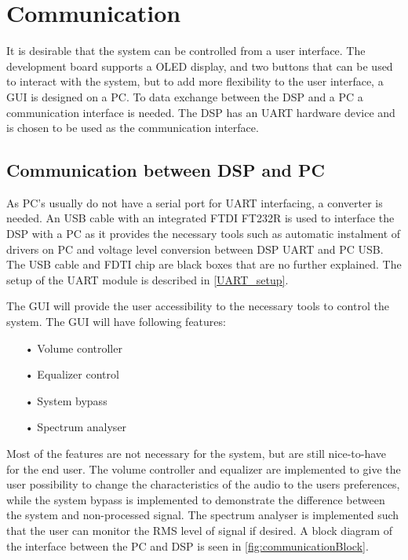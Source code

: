 \chapter{Communication}

It is desirable that the system can be controlled from a user interface. The development board supports a OLED display, and two buttons that can be used to interact with the system, but to add more flexibility to the user interface, a GUI is designed on a PC. To data exchange between the DSP and a PC a communication interface is needed. The DSP has an UART hardware device and is chosen to be used as the communication interface. 

\section{Communication between DSP and PC}

As PC's usually do not have a serial port for UART interfacing, a converter is needed.   An USB cable with an integrated FTDI FT232R is used to interface the DSP with a PC as it provides the necessary tools such as automatic instalment of drivers on PC and voltage level conversion between DSP UART and PC USB. The USB cable and FDTI chip are black boxes that are no further explained. The setup of the UART module is described in \autoref{UART_setup}.

The GUI will provide the user accessibility to the necessary tools to control the system. The GUI will have following features:
\begin{itemize}
\item[•]Volume controller
\item[•]Equalizer control
\item[•]System bypass
\item[•]Spectrum analyser
\end{itemize} 

Most of the features are not necessary for the system, but are still nice-to-have for the end user. The volume controller and equalizer are implemented to give the user possibility to change the characteristics of the audio to the users preferences, while the system bypass is implemented to demonstrate the difference between the system and non-processed signal. The spectrum analyser is implemented such that the user can monitor the RMS level of signal if desired. A block diagram of the interface between the PC and DSP is seen in \autoref{fig:communicationBlock}.

